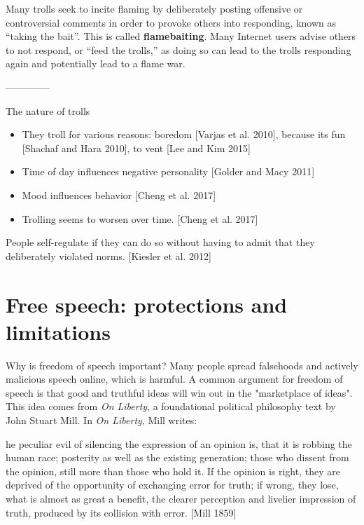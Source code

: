 \documentclass[class=book, crop=false]{standalone}
\providecommand{\keyterm}[1]{\textbf{#1}\marginnote{\scriptsize \textbf{#1}}}
\begin{document}
Many trolls seek to incite flaming by deliberately posting offensive or controversial comments in order to provoke others into responding, known as “taking the bait”. This is called \keyterm{flamebaiting}. Many Internet users advise others to not respond, or “feed the trolls,” as doing so can lead to the trolls responding again and potentially lead to a flame war.

--------------

The nature of trolls
\begin{itemize}
    \item They troll for various reasons: boredom [Varjas et al. 2010], because its fun [Shachaf and Hara 2010], to vent [Lee and Kim 2015]
    \item Time of day influences negative personality [Golder and Macy 2011]
    \item Mood influences behavior [Cheng et al. 2017]
    \item Trolling seems to worsen over time. [Cheng et al. 2017]
\end{itemize}

People self-regulate if they can do so without having to admit that they deliberately violated norms. [Kiesler et al. 2012]\\

\section{Free speech: protections and limitations}

Why is freedom of speech important? Many people spread falsehoods and actively malicious speech online, which is harmful. A common argument for freedom of speech is that good and truthful ideas will win out in the "marketplace of ideas". This idea comes from \textit{On Liberty}, a foundational political philosophy text by John Stuart Mill. In \textit{On Liberty}, Mill writes:

\begin{displayquote}
[T]he peculiar evil of silencing the expression of an opinion is, that it is robbing the human race; posterity as well as the existing generation; those who dissent from the opinion, still more than those who hold it. If the opinion is right, they are deprived of the opportunity of exchanging error for truth; if wrong, they lose, what is almost as great a benefit, the clearer perception and livelier impression of truth, produced by its collision with error. [Mill 1859]
\end{displayquote}
\end{document}

